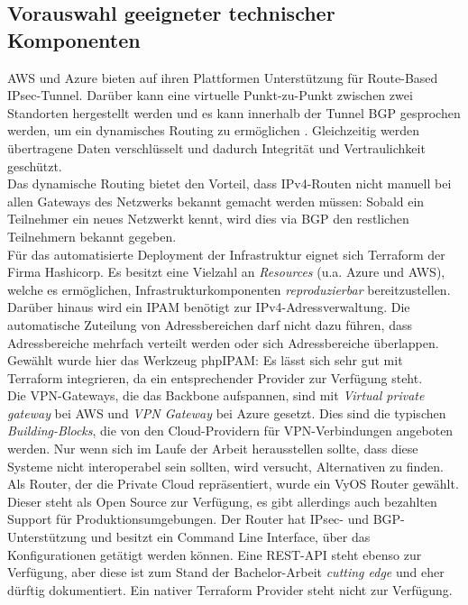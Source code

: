 \subsection{Vorauswahl geeigneter technischer Komponenten}
AWS und Azure bieten auf ihren Plattformen Unterstützung für Route-Based IPsec-Tunnel\cite[S.32]{awsvpn2021}. Darüber kann eine virtuelle Punkt-zu-Punkt zwischen zwei Standorten hergestellt werden und es kann innerhalb der Tunnel BGP gesprochen werden, um ein dynamisches Routing zu ermöglichen\cite[S. 18]{AlShawi2020} \cite[S. 74-79]{Toroman2019}. Gleichzeitig werden übertragene Daten verschlüsselt und dadurch Integrität und Vertraulichkeit geschützt.\\
Das dynamische Routing bietet den Vorteil, dass IPv4-Routen nicht manuell bei allen Gateways des Netzwerks bekannt gemacht werden müssen: Sobald ein Teilnehmer ein neues Netzwerkt kennt, wird dies via BGP den restlichen Teilnehmern bekannt gegeben.\\
Für das automatisierte Deployment der Infrastruktur eignet sich Terraform der Firma Hashicorp. Es besitzt eine Vielzahl an \textit{Resources} (u.a. Azure und AWS), welche es ermöglichen, Infrastrukturkomponenten \textit{reproduzierbar} bereitzustellen.\\
Darüber hinaus wird ein IPAM benötigt zur IPv4-Adressverwaltung. Die automatische Zuteilung von Adressbereichen darf nicht dazu führen, dass Adressbereiche mehrfach verteilt werden oder sich Adressbereiche überlappen. Gewählt wurde hier das Werkzeug phpIPAM\cite{phpipam2020}: Es lässt sich sehr gut mit Terraform integrieren, da ein entsprechender Provider zur Verfügung steht\cite{phpipamtf2020}.\\
Die VPN-Gateways, die das Backbone aufspannen, sind mit \textit{Virtual private gateway} bei AWS und \textit{VPN Gateway} bei Azure gesetzt. Dies sind die typischen \textit{Building-Blocks}, die von den Cloud-Providern für VPN-Verbindungen angeboten werden. Nur wenn sich im Laufe der Arbeit herausstellen sollte, dass diese Systeme nicht interoperabel sein sollten, wird versucht, Alternativen zu finden.\\
Als Router, der die Private Cloud repräsentiert, wurde ein VyOS Router gewählt. Dieser steht als Open Source zur Verfügung, es gibt allerdings auch bezahlten Support für Produktionsumgebungen. Der Router hat IPsec- und BGP-Unterstützung und besitzt ein Command Line Interface, über das Konfigurationen getätigt werden können. Eine REST-API steht ebenso zur Verfügung, aber diese ist zum Stand der Bachelor-Arbeit \textit{cutting edge} und eher dürftig dokumentiert\cite{vyosapi2021}. Ein nativer Terraform Provider steht nicht zur Verfügung.
